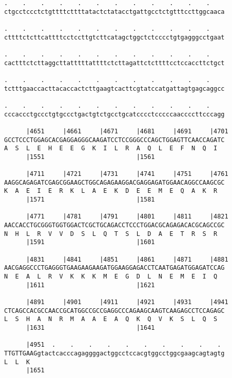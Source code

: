 \documentclass{article}
\begin{document}
\begin{Verbatim}
.    .    .    .    .    .    .    .    .    .    .    .    
ctgcctccctctgttttcttttatactctatacctgattgcctctgtttccttggcaaca
                                                            
.    .    .    .    .    .    .    .    .    .    .    .    
cttttctcttcattttcctccttgtcttcatagctggctctcccctgtgagggcctgaat
                                                            
.    .    .    .    .    .    .    .    .    .    .    .    
cactttctcttaggcttatttttattttctcttagattctcttttcctccaccttctgct
                                                            
.    .    .    .    .    .    .    .    .    .    .    .    
tctttgaaccacttacaccactcttgaagtcacttcgtatccatgattagtgagcaggcc
                                                            
.    .    .    .    .    .    .    .    .    .    .    .    
cccaccctgccctgtgccctgactgtctgcctgcatcccctcccccaaccccttcccagg
                                                            
      |4651     |4661     |4671     |4681     |4691     |4701
GCCTCCCTGGAGCACGAGGAGGGCAAGATCCTCCGGGCCCAGCTGGAGTTCAACCAGATC
A  S  L  E  H  E  E  G  K  I  L  R  A  Q  L  E  F  N  Q  I  
      |1551                         |1561                   
  
      |4711     |4721     |4731     |4741     |4751     |4761
AAGGCAGAGATCGAGCGGAAGCTGGCAGAGAAGGACGAGGAGATGGAACAGGCCAAGCGC
K  A  E  I  E  R  K  L  A  E  K  D  E  E  M  E  Q  A  K  R  
      |1571                         |1581                   
  
      |4771     |4781     |4791     |4801     |4811     |4821
AACCACCTGCGGGTGGTGGACTCGCTGCAGACCTCCCTGGACGCAGAGACACGCAGCCGC
N  H  L  R  V  V  D  S  L  Q  T  S  L  D  A  E  T  R  S  R  
      |1591                         |1601                   
  
      |4831     |4841     |4851     |4861     |4871     |4881
AACGAGGCCCTGAGGGTGAAGAAGAAGATGGAAGGAGACCTCAATGAGATGGAGATCCAG
N  E  A  L  R  V  K  K  K  M  E  G  D  L  N  E  M  E  I  Q  
      |1611                         |1621                   
  
      |4891     |4901     |4911     |4921     |4931     |4941
CTCAGCCACGCCAACCGCATGGCCGCCGAGGCCCAGAAGCAAGTCAAGAGCCTCCAGAGC
L  S  H  A  N  R  M  A  A  E  A  Q  K  Q  V  K  S  L  Q  S  
      |1631                         |1641                   
  
      |4951  .    .    .    .    .    .    .    .    .    . 
TTGTTGAAGgtactcacccagaggggactggcctccacgtggcctggcgaagcagtagtg
L  L  K                                                     
      |1651                                                 
  

\end{Verbatim}
\end{document}
